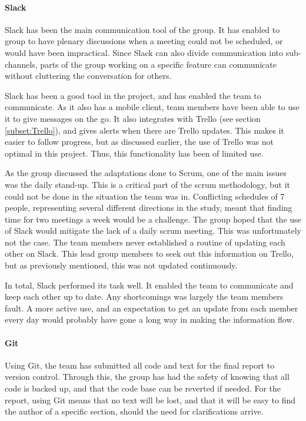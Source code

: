 \documentclass[11pt,a4paper,titlepage,oneside]{report}
\begin{document}
\paragraph{Slack}
Slack has been the main communication tool of the group. It has enabled to group to have plenary discussions when a meeting could not be scheduled, or would have been impractical. Since Slack can also divide communication into sub-channels, parts of the group working on a specific feature can communicate without cluttering the conversation for others.

Slack has been a good tool in the project, and has enabled the team to communicate. As it also has a mobile client, team members have been able to use it to give messages on the go. It also integrates with Trello (see section \ref{subset:Trello}), and gives alerts when there are Trello updates. This makes it easier to follow progress, but as discussed earlier, the use of Trello was not optimal in this project. Thus, this functionality has been of limited use. 

As the group discussed the adaptations done to Scrum, one of the main issues was the daily stand-up. This is a critical part of the scrum methodology, but it could not be done in the situation the team was in. Conflicting schedules of 7 people, representing several different directions in the study, meant that finding time for two meetings a week would be a challenge. The group hoped that the use of Slack would mitigate the lack of a daily scrum meeting. This was unfortunately not the case. The team members never established a routine of updating each other on Slack. This lead group members to seek out this information on Trello, but as previously mentioned, this was not updated continuously. 

In total, Slack performed its task well. It enabled the team to communicate and keep each other up to date. Any shortcomings was largely the team members fault. A more active use, and an expectation to get an update from each member every day would probably have gone a long way in making the information flow.

\paragraph{Git}
Using Git, the team has submitted all code and text for the final report to version control. Through this, the group has had the safety of knowing that all code is backed up, and that the code base can be reverted if needed. For the report, using Git means that no text will be lost, and that it will be easy to find the author of a specific section, should the need for clarifications arrive. 
\end{document}
